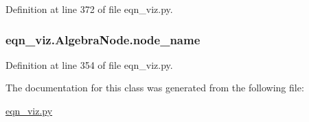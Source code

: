 Definition at line 372 of file eqn\+\_\+viz.\+py.

\hypertarget{classeqn__viz_1_1_algebra_node_a6b8ed9f312eb416c8231f16b6abf77a0}{}
\subsubsection[{node\+\_\+name}]{\setlength{\rightskip}{0pt plus 5cm}eqn\+\_\+viz.\+Algebra\+Node.\+node\+\_\+name}\label{classeqn__viz_1_1_algebra_node_a6b8ed9f312eb416c8231f16b6abf77a0}


Definition at line 354 of file eqn\+\_\+viz.\+py.



The documentation for this class was generated from the following file\+:\begin{DoxyCompactItemize}
\item 
\hyperlink{eqn__viz_8py}{eqn\+\_\+viz.\+py}\end{DoxyCompactItemize}
